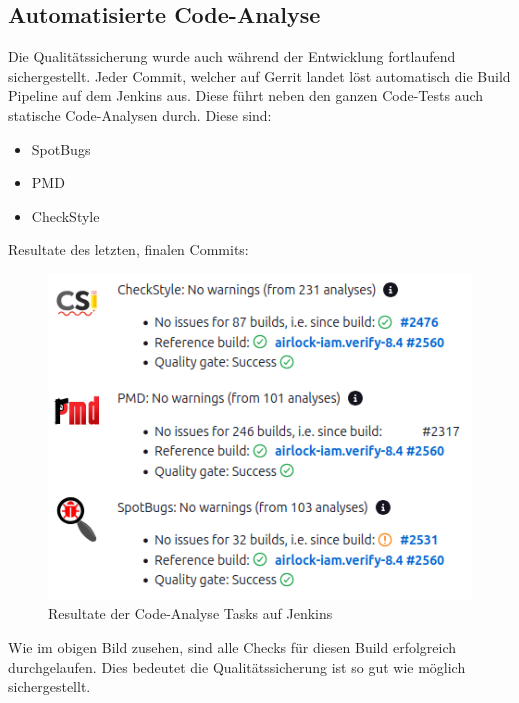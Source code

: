 \subsection{Automatisierte Code-Analyse}
Die Qualitätssicherung wurde auch während der Entwicklung fortlaufend sichergestellt. Jeder Commit, welcher auf Gerrit landet löst automatisch die Build Pipeline auf dem Jenkins aus. Diese führt neben den ganzen Code-Tests auch statische Code-Analysen durch. Diese sind:
\begin{itemize}
	\item SpotBugs
	\item PMD
	\item CheckStyle
\end{itemize}
\newpage
Resultate des letzten, finalen Commits:
\begin{figure}[H]
	\begin{center}
		\includegraphics[width=0.8 \textwidth]{ressourcen/codeana}
		\caption[Resultate Code-Analyse]{Resultate der Code-Analyse Tasks auf Jenkins}\label{fig:codeana}
	\end{center}
\end{figure}
\noindent Wie im obigen Bild zusehen, sind alle Checks für diesen Build erfolgreich durchgelaufen. Dies bedeutet die Qualitätssicherung ist so gut wie möglich sichergestellt.
